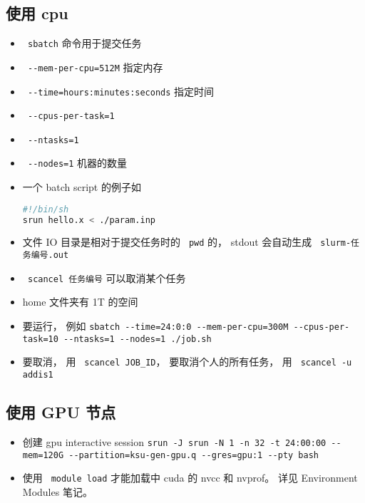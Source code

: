 
\begin{issues}
\issueDraft
\end{issues}

\subsection{使用 cpu}
\begin{itemize}
\item \verb` sbatch` 命令用于提交任务
\item \verb` --mem-per-cpu=512M` 指定内存
\item \verb` --time=hours:minutes:seconds` 指定时间
\item \verb` --cpus-per-task=1`
\item \verb` --ntasks=1`
\item \verb` --nodes=1` 机器的数量
\item 一个 batch script 的例子如
\begin{lstlisting}[language=bash]
#!/bin/sh
srun hello.x < ./param.inp
\end{lstlisting}
\item 文件 IO 目录是相对于提交任务时的 \verb` pwd` 的， stdout 会自动生成 \verb` slurm-任务编号.out`
\item \verb` scancel 任务编号` 可以取消某个任务
\item home 文件夹有 1T 的空间
\item 要运行， 例如
\verb|sbatch --time=24:0:0 --mem-per-cpu=300M --cpus-per-task=10 --ntasks=1 --nodes=1 ./job.sh|
\item 要取消， 用 \verb` scancel JOB_ID`， 要取消个人的所有任务， 用 \verb` scancel -u addis1`
\end{itemize}

\subsection{使用 GPU 节点}
\begin{itemize}
\item 创建 gpu interactive session \verb|srun -J srun -N 1 -n 32 -t 24:00:00 --mem=120G --partition=ksu-gen-gpu.q --gres=gpu:1 --pty bash|
\item 使用 \verb` module load` 才能加载中 cuda 的 nvcc 和 nvprof。 详见 Environment Modules 笔记。
\end{itemize}
